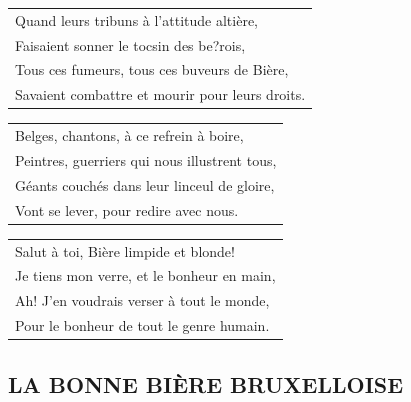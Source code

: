 \documentclass{article}
\begin{document}
\begin{flushleft}
\begin{tabularx}{0.8\textwidth} {
   >{\raggedright\arraybackslash}X}
Quand leurs tribuns à l’attitude altière, \\
Faisaient sonner le tocsin des be?rois, \\
Tous ces fumeurs, tous ces buveurs de Bière, \\
Savaient combattre et mourir pour leurs droits. \\
\end{tabularx}
\end{flushleft}
\begin{flushleft}
\begin{tabularx}{0.8\textwidth} {
   >{\raggedright\arraybackslash}X}
Belges, chantons, à ce refrein à boire, \\
Peintres, guerriers qui nous illustrent tous, \\
Géants couchés dans leur linceul de gloire, \\
Vont se lever, pour redire avec nous. \\
\end{tabularx}
\end{flushleft}
\begin{flushleft}
\begin{tabularx}{0.8\textwidth} {
   >{\raggedright\arraybackslash}X}
Salut à toi, Bière limpide et blonde! \\
Je tiens mon verre, et le bonheur en main, \\
Ah! J’en voudrais verser à tout le monde, \\
Pour le bonheur de tout le genre humain. \\
\end{tabularx}
\end{flushleft}
\subsection*{LA BONNE BIÈRE BRUXELLOISE}
\end{document}
